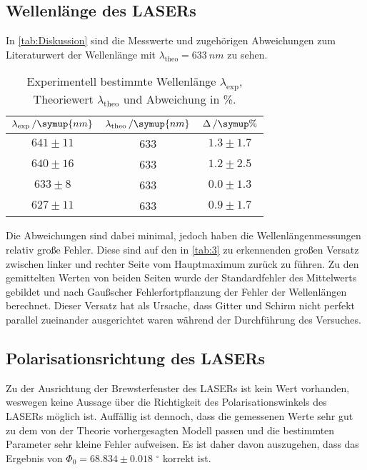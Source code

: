 \subsection{Wellenlänge des LASERs}
In \autoref{tab:Diskussion} sind die Messwerte und zugehörigen Abweichungen zum Literaturwert der Wellenlänge mit $\lambda_\text{theo} = \SI{633}{nm}$ \cite{eichler} zu sehen.
\begin{table}[H]
    \centering
    \caption{Experimentell bestimmte Wellenlänge $\lambda_\text{exp}$, Theoriewert $\lambda_\text{theo}$ und Abweichung in \%.}
    \begin{tabular}{c c c}
        \toprule
        {$\lambda_\text{exp}\,/\symup{nm}$} & {$\lambda_\text{theo}\,/\symup{nm}$} & {$\Delta\,/\symup{\%}$}\\
        \midrule
        {$641 \pm 11$} & 633 & {$1.3 \pm 1.7$} \\
        {$640 \pm 16$} & 633 & {$1.2 \pm 2.5$} \\
        {$633 \pm 8$} & 633 & {$0.0 \pm 1.3$} \\
        {$627 \pm 11$} & 633 & {$0.9 \pm 1.7$} \\
        \bottomrule
    \end{tabular}
    \label{tab:Diskussion}
\end{table}
Die Abweichungen sind dabei minimal, jedoch haben die Wellenlängenmessungen relativ große Fehler. Diese sind auf den in \autoref{tab:3} zu erkennenden großen Versatz zwischen linker und rechter Seite vom Hauptmaximum zurück zu führen. Zu den gemittelten Werten von beiden Seiten wurde der Standardfehler des Mittelwerts gebildet und nach Gaußscher Fehlerfortpflanzung der Fehler der Wellenlängen berechnet. Dieser Versatz hat als Ursache, dass Gitter und Schirm nicht perfekt parallel zueinander ausgerichtet waren während der Durchführung des Versuches.
\subsection{Polarisationsrichtung des LASERs}
Zu der Ausrichtung der Brewsterfenster des LASERs ist kein Wert vorhanden, weswegen keine Aussage über die Richtigkeit des Polarisationswinkels des LASERs möglich ist. Auffällig ist dennoch, dass die gemessenen Werte sehr gut zu dem von der Theorie vorhergesagten Modell passen und die bestimmten Parameter sehr kleine Fehler aufweisen. Es ist daher davon auszugehen, dass das Ergebnis von
$\Phi_0 = 68.834 \pm 0.018 \, \, ^\circ$ korrekt ist.
